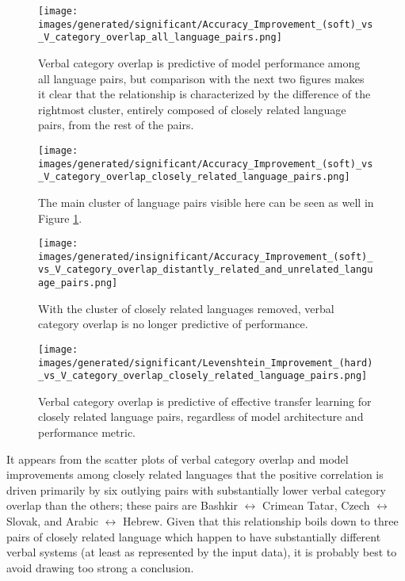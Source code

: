 \begin{figure}[ht]
\texttt{[image: images/generated/significant/Accuracy\_Improvement\_(soft)\_vs\_V\_category\_overlap\_all\_language\_pairs.png]}
\centering
\caption{Verbal category overlap is predictive of model performance among all language pairs, but comparison with the next two figures makes it clear that the relationship is characterized by the difference of the rightmost cluster, entirely composed of closely related language pairs, from the rest of the pairs.}
\label{fig:AIsVa}
\end{figure}

\begin{figure}[ht]
\texttt{[image: images/generated/significant/Accuracy\_Improvement\_(soft)\_vs\_V\_category\_overlap\_closely\_related\_language\_pairs.png]}
\centering
\caption{The main cluster of language pairs visible here can be seen as well in Figure \ref{fig:AIsVa}.}
\end{figure}

\begin{figure}[ht]
\texttt{[image: images/generated/insignificant/Accuracy\_Improvement\_(soft)\_vs\_V\_category\_overlap\_distantly\_related\_and\_unrelated\_language\_pairs.png]}
\centering
\caption{With the cluster of closely related languages removed, verbal category overlap is no longer predictive of performance.}
\end{figure}

\begin{figure}[ht]
\texttt{[image: images/generated/significant/Levenshtein\_Improvement\_(hard)\_vs\_V\_category\_overlap\_closely\_related\_language\_pairs.png]}
\centering
\caption{Verbal category overlap is predictive of effective transfer learning for closely related language pairs, regardless of model architecture and performance metric.}
\end{figure}

It appears from the scatter plots of verbal category overlap and model improvements among closely related languages that the positive correlation is driven primarily by six outlying pairs with substantially lower verbal category overlap than the others; these pairs are Bashkir $\leftrightarrow$ Crimean Tatar, Czech $\leftrightarrow$ Slovak, and Arabic $\leftrightarrow$ Hebrew. Given that this relationship boils down to three pairs of closely related language which happen to have substantially different verbal systems (at least as represented by the input data), it is probably best to avoid drawing too strong a conclusion.

